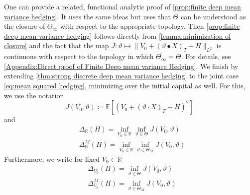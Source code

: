 \documentclass[11pt,a4paper,twoside,openany]{report}
\theoremstyle{plain} %
\theoremstyle{definition} %
\theoremstyle{remark} %
\begin{document}
\bigbreak
One can provide a related, functional analytic proof of \cref{prop:finite deep mean variance hedging}. It uses the same ideas but uses that 
\(\Theta\) can be understood as the closure of \(\Theta_{\infty}\) with respect to the appropriate topology. Then \cref{prop:finite deep mean variance hedging} follows directly from \cref{lemma:minimization of closure} and the fact that the map \(J:\vartheta\mapsto\lVert V_0+(\vartheta\bullet X)_T-H\rVert_{L^2}\) is continuous with respect to the topology in which \(\overline{\Theta_{\infty}}=\Theta\). For details, see \cref{Appendix:Direct proof of Finite Deep mean variance Hedging}.
\bigbreak
We finish by extending \cref{thm:strong discrete deep mean variance hedging} to the joint case \cref{eq:mean squared hedging}, minimizing over the initial capital as well. For this, we use the notation 
\begin{equation}
    J(V_0,\vartheta)\coloneqq \mathbb{E}[(V_0+(\vartheta\cdot X)_T-H)^2]
\end{equation}
and 
\begin{align*}
&\Delta_{\mathbb{R}}(H)=\inf_{V_0\in\mathbb{R}}\inf_{\vartheta\in \Theta}J(V_0,\vartheta)
\\
&\Delta^M_{\mathbb{R}}(H)=\inf_{V_0\in\mathbb{R}}\inf_{\vartheta\in \Theta_M}J(V_0,\vartheta)
\end{align*}
Furthermore, we write for fixed \(V_0\in\mathbb{R}\)
\begin{align}
    &\Delta_{V_0}(H)=\inf_{\vartheta\in\Theta}J(V_0,\vartheta)\\
    &\Delta^M_{V_0}(H)=\inf_{\vartheta\in\Theta_M}J(V_0,\vartheta)
\end{align}
\end{document}
